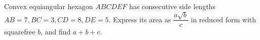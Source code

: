 Convex equiangular hexagon $ABCDEF$ has consecutive side lengths $AB=7,BC=3,CD=8,DE=5$. Express its area as $\dfrac{a\sqrt b}{c}$ in reduced form with squarefree $b$, and find $a+b+c$.
